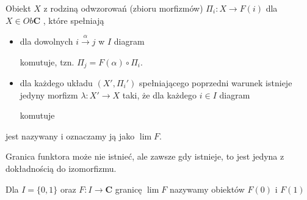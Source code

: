 \begin{definition}
  Obiekt $X$ z rodziną odwzorowań (zbioru morfizmów) $\Pi_i:X\to F(i)$ dla $X\in Ob\mathbf{C}$ , które spełniają
  \begin{itemize}
    \item \acc{[zgodność]} dla dowolnych $i\xrightarrow{\alpha}j$ w $I$ diagram
      \begin{center}\end{center}
      komutuje, tzn. $\Pi_j=F(\alpha)\circ\Pi_i$.
    \item \acc{[uniwersalność]} dla każdego układu $(X',\Pi_i')$ spełniającego poprzedni warunek istnieje jedyny morfizm $\lambda:X'\to X$ taki, że dla każdego $i\in I$ diagram
      \begin{center}\end{center}
    komutuje
  \end{itemize}
  jest nazywany  i oznaczamy ją jako $\lim F$.
\end{definition}

Granica funktora może nie istnieć, ale zawsze gdy istnieje, to jest jedyna z dokładnością do izomorfizmu.

\begin{example}
  \item Dla $I=\{0,1\}$ oraz $F:I\to \mathbf{C}$ granicę $\lim F$ nazywamy  obiektów $F(0)$ i $F(1)$
    \begin{center}\end{center}
\end{example}

\begin{definition} 
\end{definition}
